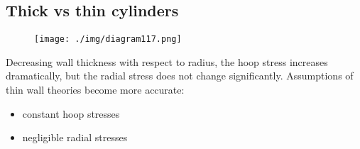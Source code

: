 \subsection{Thick vs thin cylinders}
\begin{figure}[H]
  \centering
  \texttt{[image: ./img/diagram117.png]}
  \caption{}
\end{figure}
Decreasing wall thickness with respect to radius, the hoop stress increases dramatically, but the radial stress does not change significantly. Assumptions of thin wall theories become more accurate:
\begin{itemize}
  \item constant hoop stresses
  \item negligible radial stresses
\end{itemize}